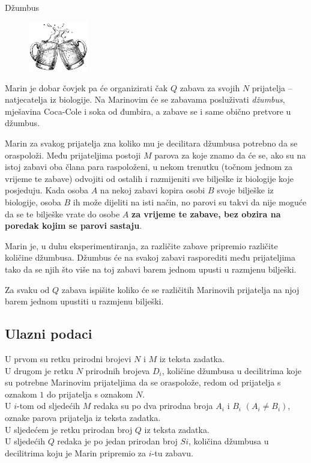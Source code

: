 \begin{statement}[
  problempoints=110,
  timelimit=1 sekunda,
  memorylimit=512 MiB,
]{Džumbus}

\setlength\intextsep{-0.1cm}
\begin{figure}
\centering
\includegraphics[width=0.23\textwidth]{img/dzumbus.png}
\end{figure}

Marin je dobar čovjek pa će organizirati čak $Q$ zabava za svojih $N$ prijatelja
-- natjecatelja iz biologije. Na Marinovim će se zabavama posluživati
\textit{džumbus}, mješavina Coca-Cole i soka od đumbira, a zabave se i same
obično pretvore u džumbus.

Marin za svakog prijatelja zna koliko mu je decilitara džumbusa potrebno da se
oraspoloži. Među prijateljima postoji $M$ parova za koje znamo da će se, ako su
na istoj zabavi oba člana para raspoloženi, u nekom trenutku (točnom jednom za
vrijeme te zabave) odvojiti od ostalih i razmijeniti sve bilješke iz biologije
koje posjeduju. Kada osoba $A$ na nekoj zabavi kopira osobi $B$ svoje bilješke
iz biologije, osoba $B$ ih može dijeliti na isti način, no parovi su takvi da
nije moguće da se te bilješke vrate do osobe $A$ \textbf{za vrijeme te zabave,
bez obzira na poredak kojim se parovi sastaju}.

Marin je, u duhu eksperimentiranja, za različite zabave pripremio različite
količine džumbusa. Džumbus će na svakoj zabavi rasporediti među prijateljima
tako da se njih što više na toj zabavi barem jednom upusti u razmjenu bilješki.

Za svaku od $Q$ zabava ispišite koliko će se različitih Marinovih prijatelja na
njoj barem jednom upustiti u razmjenu bilješki.
\subsection*{Ulazni podaci}
U prvom su retku prirodni brojevi $N$ i $M$ iz teksta zadatka. \\
U drugom je retku $N$ prirodnih brojeva $D_i$, količine džumbusa u
decilitrima koje su potrebne Marinovim prijateljima da se oraspolože, redom
od prijatelja s oznakom $1$ do prijatelja s oznakom $N$. \\
U $i$-tom od sljedećih $M$ redaka su po dva prirodna broja $A_i$ i $B_i$
$(A_i \ne B_i)$, oznake parova prijatelja iz teksta zadatka. \\
U sljedećem je retku prirodan broj $Q$ iz teksta zadatka. \\
U sljedećih $Q$ redaka je po jedan prirodan broj $Si$, količina džumbusa u
decilitrima koju je Marin pripremio za $i$-tu zabavu.



\end{statement}

